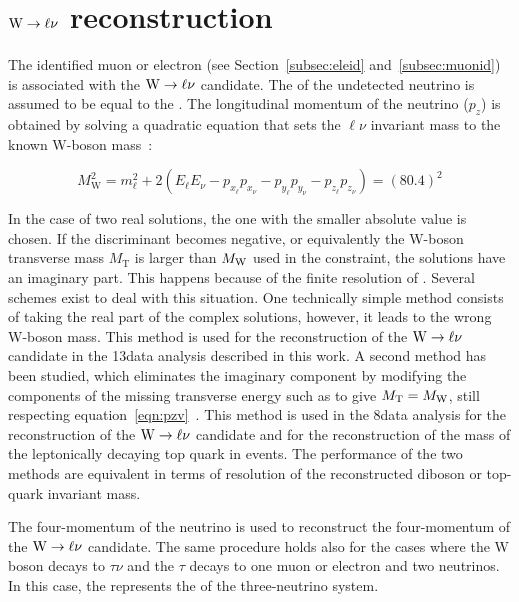 \section{$\mathrm{W}\to\ell\nu$ reconstruction}\label{sec:leptonicW}

The identified muon or electron (see Section~\ref{subsec:eleid} and~\ref{subsec:muonid}) is associated with the $\mathrm{W}\to\ell\nu$ candidate. 
The \Vpt of the undetected neutrino is assumed to be equal to the \ptvecmiss. The longitudinal momentum of the neutrino ($p_z$) is obtained by solving a quadratic equation that sets the $\ell\nu$ invariant
mass to the known W-boson mass~\cite{Olive:2016xmw}:

\begin{equation}\label{eqn:pzv}
M_\mathrm{W}^2 = m_\ell^2   + 2(E_\ell E_\nu - p_{x_\ell}p_{x_\nu} - p_{y_\ell}p_{y_\nu} - p_{z_\ell}p_{z_\nu} ) = (80.4)^2
\end{equation}

In the case of two real solutions, the one with the smaller absolute value is chosen.
If the discriminant becomes negative, or equivalently the W-boson transverse mass $M_\mathrm{T}$ is larger than $M_\mathrm{W}$ used in the constraint, the solutions have an imaginary part. This happens because of the finite resolution of \ETmiss.
Several schemes exist to deal with this situation. One technically simple method consists of taking the real part of the complex solutions, however, it leads to the wrong W-boson mass. This method is used for the reconstruction of the $\mathrm{W}\to\ell\nu$ candidate in the 13\TeV data analysis described in this work.
A second method has been studied, which eliminates the imaginary component by modifying the components of the missing transverse energy such as to give $M_\mathrm{T} =  M_\mathrm{W}$, still respecting equation~\ref{eqn:pzv}~\cite{BauerPhd10}. This method is used in the 8\TeV data analysis for the reconstruction of the $\mathrm{W}\to\ell\nu$ candidate and for the reconstruction of the mass of the leptonically decaying top quark in \ttbar events. The performance of the two methods are equivalent in terms of resolution of the reconstructed diboson or top-quark invariant mass.

The four-momentum of the neutrino is used to reconstruct the four-momentum of the $\mathrm{W}\to\ell\nu$ candidate.
The same procedure holds also for the cases where the W boson decays to $\tau\nu$ and the $\tau$ decays to one muon or electron and two neutrinos.
In this case, the \ptvecmiss represents the \Vpt of the three-neutrino system.